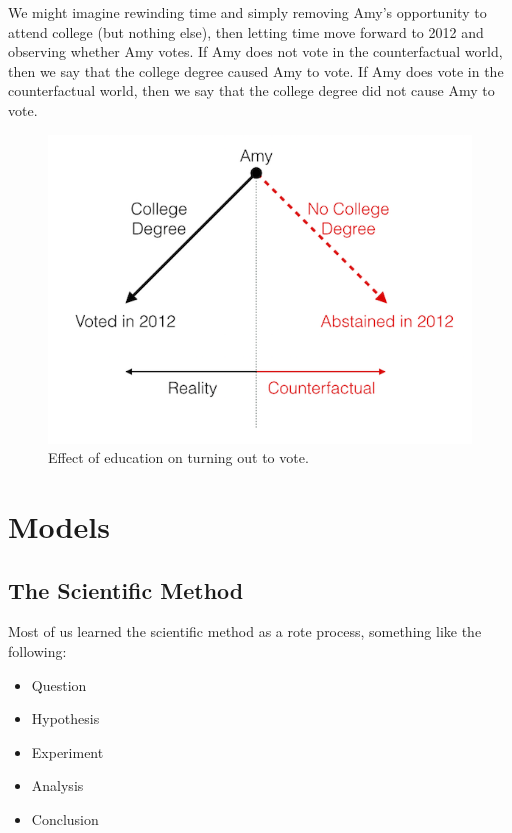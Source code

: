 \documentclass[]{book}
\providecommand{\tightlist}{%
  \setlength{\itemsep}{0pt}\setlength{\parskip}{0pt}}
\theoremstyle{definition}
\theoremstyle{definition}
\theoremstyle{definition}
\theoremstyle{remark}
\begin{document}
We might imagine rewinding time and simply removing Amy's opportunity to
attend college (but nothing else), then letting time move forward to
2012 and observing whether Amy votes. If Amy does not vote in the
counterfactual world, then we say that the college degree caused Amy to
vote. If Amy does vote in the counterfactual world, then we say that the
college degree did not cause Amy to vote.

\begin{figure}
\centering
\includegraphics{diagrams/cf-amy.png}
\caption{Effect of education on turning out to vote.}
\end{figure}

\chapter{Models}\label{models}

\section{The Scientific Method}\label{the-scientific-method}

Most of us learned the scientific method as a rote process, something
like the following:

\begin{itemize}
\tightlist
\item
  Question
\item
  Hypothesis
\item
  Experiment
\item
  Analysis
\item
  Conclusion
\end{itemize}
\end{document}
